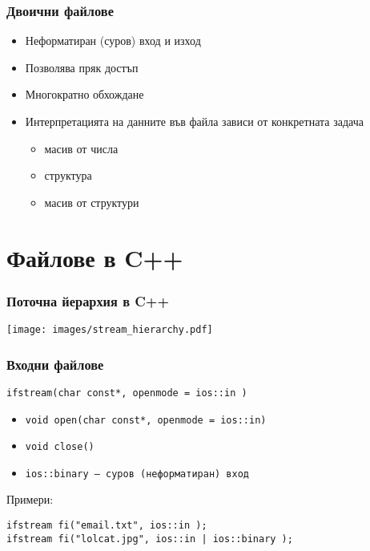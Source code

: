 \documentclass{beamer}
\begin{document}
\begin{frame}
  \frametitle{Двоични файлове}
  \begin{itemize}
  \item Неформатиран (суров) вход и изход
  \item Позволява пряк достъп
  \item Многократно обхождане
  \item Интерпретацията на данните във файла зависи от конкретната задача
    \begin{itemize}
    \item  масив от числа
    \item структура
    \item масив от структури
    \end{itemize}
  \end{itemize}
\end{frame}

\section{Файлове в C++}

\begin{frame}
  \frametitle{Поточна йерархия в C++}

  \texttt{[image: images/stream\_hierarchy.pdf]}
\end{frame}

\begin{frame}[fragile]
  \frametitle{Входни файлове}

  \verb#ifstream(char const*, openmode = ios::in )#
  \vspace{1em}

  \begin{itemize}
  \item \verb#void open(char const*, openmode = ios::in)#
  \item \verb#void close()#
  \item \tt{ios::binary} — суров (неформатиран) вход
  \end{itemize}
  \vspace{3em}

  Примери:
\begin{verbatim}
ifstream fi("email.txt", ios::in );
ifstream fi("lolcat.jpg", ios::in | ios::binary );
\end{verbatim}
\end{frame}
\end{document}
